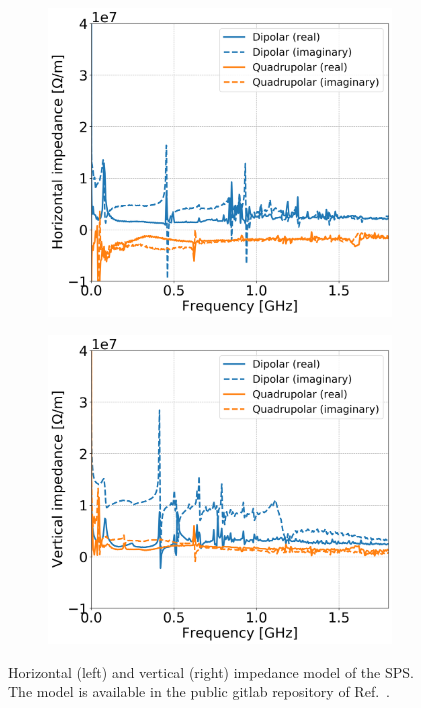 \begin{figure}[!ht]
    \centering
    \begin{subfigure}[t]{0.45\textwidth}
        \centering
        \includegraphics[width=1\textwidth]{images/Ch7/Q26_complete_SPS_model_impedance_H_plane.png}
    \end{subfigure}
    \hfill
    \begin{subfigure}[t]{0.45\textwidth}
        \centering
        \includegraphics[width=1\textwidth]{images/Ch7/Q26_complete_SPS_model_impedance_V_plane.png}
    \end{subfigure}
    \hfill
     \caption{Horizontal (left) and vertical (right) impedance model of the SPS. The model is available in the public gitlab repository of Ref.~\cite{sps_impedance_model_git}.} %
     \label{fig:sps_impedance_model_H_V}
 \end{figure}


